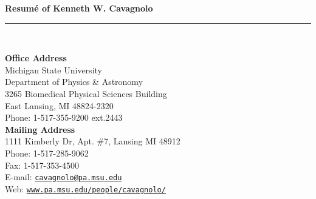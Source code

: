 \documentclass[11pt]{cv}
\begin{document}

\begin{center}
{\large \textbf{\sc Resum\'{e} of Kenneth W. Cavagnolo}}\\
\rule{17.35cm}{1pt}\\
\end{center}
\normalsize

\addresses
{
{\bf Office Address}\\
Michigan State University\\
Department of Physics \& Astronomy\\
3265 Biomedical Physical Sciences Building\\
East Lansing, MI 48824-2320\\
Phone: 1-517-355-9200 ext.2443\\
}
{
{\bf Mailing Address}\\
1111 Kimberly Dr, Apt. \#7, Lansing MI 48912\\
Phone: 1-517-285-9062\\
Fax: 1-517-353-4500\\
E-mail: \href{mailto:cavagnolo@pa.msu.edu}{\tt cavagnolo@pa.msu.edu}\\
Web: \href{http://www.pa.msu.edu/people/cavagnolo/}{\tt www.pa.msu.edu/people/cavagnolo/}\\
}
\end{document}

